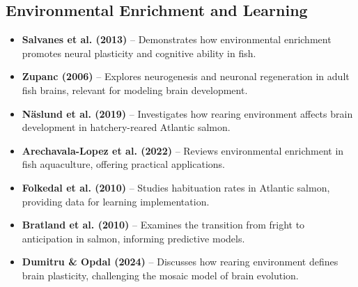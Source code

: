 \documentclass[11pt,a4paper]{article}
\begin{document}
\subsection*{Environmental Enrichment and Learning}
\begin{itemize}
    \item \textbf{Salvanes et al. (2013)} \cite{salvanes2013environmental} -- Demonstrates how environmental enrichment promotes neural plasticity and cognitive ability in fish.
    
    \item \textbf{Zupanc (2006)} \cite{zupanc2006neurogenesis} -- Explores neurogenesis and neuronal regeneration in adult fish brains, relevant for modeling brain development.
    
    \item \textbf{Näslund et al. (2019)} \cite{naslund2019fish} -- Investigates how rearing environment affects brain development in hatchery-reared Atlantic salmon.
    
    \item \textbf{Arechavala-Lopez et al. (2022)} \cite{arechavalalopez2022environmental} -- Reviews environmental enrichment in fish aquaculture, offering practical applications.
    
    \item \textbf{Folkedal et al. (2010)} \cite{folkedal2010habituation} -- Studies habituation rates in Atlantic salmon, providing data for learning implementation.
    
    \item \textbf{Bratland et al. (2010)} \cite{bratland2010fright} -- Examines the transition from fright to anticipation in salmon, informing predictive models.
    
    \item \textbf{Dumitru \& Opdal (2024)} \cite{dumitru2024beyond} -- Discusses how rearing environment defines brain plasticity, challenging the mosaic model of brain evolution.
\end{itemize}
\end{document}
